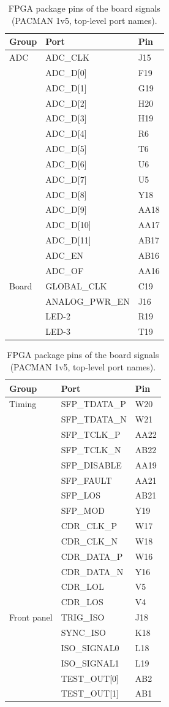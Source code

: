 \documentclass[12pt]{article}
\begin{document}
\begin{table}[htbp]
\caption{\label{tbl:pins-board} FPGA package pins of the board signals (PACMAN 1v5, top-level port names).}
\begin{center}
\begin{tabular}[t]{lll}
Group & Port & Pin \\
\hline
ADC & ADC\_CLK & J15 \\
 & ADC\_D[0] & F19 \\
 & ADC\_D[1] & G19 \\
 & ADC\_D[2] & H20 \\
 & ADC\_D[3] & H19 \\
 & ADC\_D[4] & R6 \\
 & ADC\_D[5] & T6 \\
 & ADC\_D[6] & U6 \\
 & ADC\_D[7] & U5 \\
 & ADC\_D[8] & Y18 \\
 & ADC\_D[9] & AA18 \\
 & ADC\_D[10] & AA17 \\
 & ADC\_D[11] & AB17 \\
 & ADC\_EN & AB16 \\
 & ADC\_OF & AA16 \\
\hline
Board & GLOBAL\_CLK & C19 \\
 & ANALOG\_PWR\_EN & J16 \\
 & LED-2 & R19 \\
 & LED-3 & T19 \\
\end{tabular}
\hspace{2em}
\begin{tabular}[t]{lll}
Group & Port & Pin \\
\hline
Timing & SFP\_TDATA\_P & W20 \\
 & SFP\_TDATA\_N & W21 \\
 & SFP\_TCLK\_P & AA22 \\
 & SFP\_TCLK\_N & AB22 \\
 & SFP\_DISABLE & AA19 \\
 & SFP\_FAULT & AA21 \\
 & SFP\_LOS & AB21 \\
 & SFP\_MOD & Y19 \\
 & CDR\_CLK\_P & W17 \\
 & CDR\_CLK\_N & W18 \\
 & CDR\_DATA\_P & W16 \\
 & CDR\_DATA\_N & Y16 \\
 & CDR\_LOL & V5 \\
 & CDR\_LOS & V4 \\
\hline
Front panel & TRIG\_ISO & J18 \\
 & SYNC\_ISO & K18 \\
 & ISO\_SIGNAL0 & L18 \\
 & ISO\_SIGNAL1 & L19 \\
 & TEST\_OUT[0] & AB2 \\
 & TEST\_OUT[1] & AB1 \\
\end{tabular}
\end{center}
\end{table}
\end{document}
